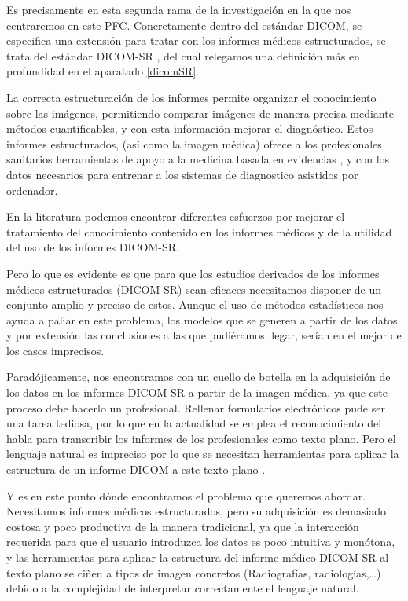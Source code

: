 Es precisamente en esta segunda rama de la investigación en la que nos centraremos en este PFC. Concretamente dentro del estándar DICOM, se especifica una extensión para tratar con los informes médicos estructurados, se trata del estándar DICOM-SR \cite{clunie2000dicom}, del cual relegamos una definición más en profundidad en el aparatado \ref{dicomSR}.\par
La correcta estructuración de los informes permite organizar el conocimiento sobre las imágenes, permitiendo comparar imágenes de manera precisa mediante métodos cuantificables, y con esta información mejorar el diagnóstico.  Estos informes estructurados, (así como la imagen médica) ofrece a los profesionales sanitarios herramientas de apoyo a la medicina basada en evidencias \cite{Sackett19973, Darlenski2010553, Elphick2004525}, y con los datos necesarios para entrenar a los sistemas de diagnostico asistidos por ordenador.\medskip\par

En la literatura podemos encontrar diferentes esfuerzos por mejorar el tratamiento del conocimiento contenido en los informes médicos\cite{BlanquerEspert:2009:COV:1528937.1529213,journals/jbi/TorresQEH12, journals/jamia/Tirado-RamosHL02}  y de la utilidad del uso de los informes DICOM-SR. \par
Pero lo que es evidente es que para que los estudios derivados de los informes médicos estructurados (DICOM-SR) sean eficaces necesitamos disponer de un conjunto amplio y preciso de estos. Aunque el uso de métodos estadísticos nos ayuda a paliar en  este problema, los modelos que se generen a partir de los datos y por extensión las conclusiones a las que pudiéramos llegar, serían en el mejor de los casos imprecisos. \par
Paradójicamente, nos encontramos con un cuello de botella en la adquisición de los datos en los informes DICOM-SR a partir de la imagen médica, ya que este proceso debe hacerlo un profesional. Rellenar formularios electrónicos pude ser una tarea tediosa, por lo que en la actualidad se emplea el reconocimiento del habla  para transcribir los informes de los profesionales como texto plano. Pero el lenguaje natural es impreciso por lo que se necesitan herramientas para aplicar la estructura de un informe DICOM a este texto plano \cite{sevenster2012aut, 9227155, citeulike:191295}. \medskip\par

Y es en este punto dónde encontramos el problema que queremos abordar. Necesitamos informes médicos estructurados, pero su adquisición es demasiado costosa y poco productiva de la manera tradicional, ya que la interacción requerida para que el usuario introduzca los datos es poco intuitiva y monótona, y las herramientas para aplicar la estructura del informe médico DICOM-SR al texto plano se ciñen a tipos de imagen concretos (Radiografías, radiologías,\ldots) debido a la complejidad de interpretar correctamente el lenguaje natural.\medskip\par

